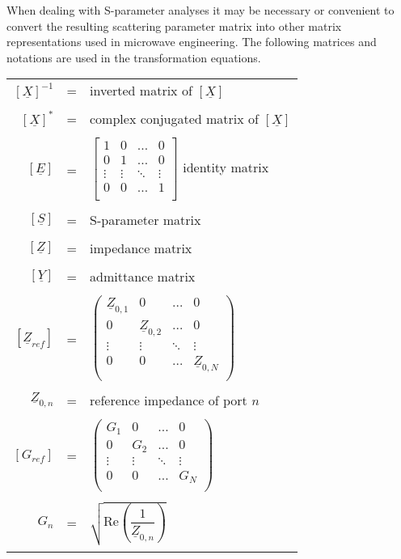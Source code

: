 When dealing with S-parameter analyses it may be necessary or
convenient to convert the resulting scattering parameter matrix into
other matrix representations used in microwave engineering.
The following matrices and notations are used in the
transformation equations.

\addvspace{12pt}

\begin{tabular}{rll}
$\left[\underline{X}\right]^{-1}$ & = & 
inverted matrix of $\left[\underline{X}\right]$\\& &\\
$\left[\underline{X}\right]^{*}$ & = & 
complex conjugated matrix of $\left[\underline{X}\right]$\\& &\\
$\left[\underline{E}\right]$ & = &
$\begin{bmatrix}
1 & 0 & \ldots & 0\\
0 & 1 & \ldots & 0\\
\vdots & \vdots & \ddots & \vdots\\
0 & 0 & \ldots & 1\\
\end{bmatrix}$
identity matrix\\& &\\
$\left[\underline{S}\right]$ & = & S-parameter matrix\\& &\\
$\left[\underline{Z}\right]$ & = & impedance matrix\\& &\\
$\left[\underline{Y}\right]$ & = & admittance matrix\\& &\\
$\left[\underline{Z}_{ref}\right]$ & = &
$\begin{pmatrix}
\underline{Z}_{0,1} & 0 & \ldots & 0\\
0 & \underline{Z}_{0,2} & \ldots & 0\\
\vdots & \vdots & \ddots & \vdots\\
0 & 0 & \ldots & \underline{Z}_{0,N}\\
\end{pmatrix}$\\& &\\
$\underline{Z}_{0,n}$ & = &
reference impedance of port $n$\\& &\\
$\left[G_{ref}\right]$ & = &
$\begin{pmatrix}
G_1 & 0 & \ldots & 0\\
0 & G_2 & \ldots & 0\\
\vdots & \vdots & \ddots & \vdots\\
0 & 0 & \ldots & G_N\\
\end{pmatrix}$\\& &\\
$G_n$ & = &
$\sqrt{\text{Re}\left(\dfrac{1}{\underline{Z}_{0,n}}\right)}$\\& &\\
\end{tabular}

